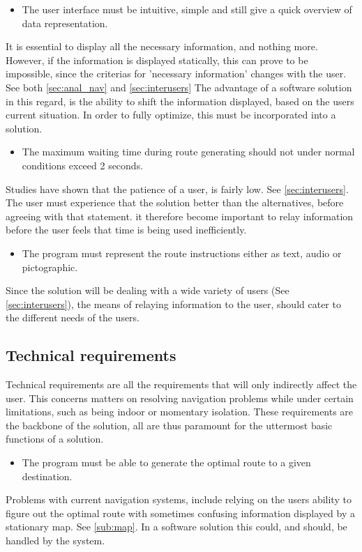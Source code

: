 \begin{itemize}
	\item The user interface must be intuitive, simple and still give a quick overview of data representation.
\end{itemize}
It is essential to display all the necessary information, and nothing more. However, if the information is displayed statically, this can prove to be impossible, since the criterias for 'necessary information' changes with the user. See both \cref{sec:anal_nav} and \cref{sec:interusers} The advantage of a software solution in this regard, is the ability to shift the information displayed, based on the users current situation. In order to fully optimize, this must be incorporated into a solution.

\begin{itemize}
	\item The maximum waiting time during route generating should not under normal conditions exceed 2 seconds.\label{irm_tid}
\end{itemize}
Studies have shown that the patience of a user, is fairly low. See \cref{sec:interusers}. The user must experience that the solution better than the alternatives, before agreeing with that statement. it therefore become important to relay information before the user feels that time is being used inefficiently.

\begin{itemize}
	\item The program must represent the route instructions either as text, audio or pictographic.
\end{itemize}
Since the solution will be dealing with a wide variety of users (See \cref{sec:interusers}), the means of relaying information to the user, should cater to the different needs of the users.


\subsection{Technical requirements}

Technical requirements are all the requirements that will only indirectly affect the user. This concerns matters on resolving navigation problems while under certain limitations, such as being indoor or momentary isolation. These requirements are the backbone of the solution, all are thus paramount for the uttermost basic functions of a solution.

\begin{itemize}
	\item The program must be able to generate the optimal route to a given destination.
\end{itemize}
Problems with current navigation systems, include relying on the users ability to figure out the optimal route with sometimes confusing information displayed by a stationary map. See \cref{sub:map}. In a software solution this could, and should, be handled by the system.

